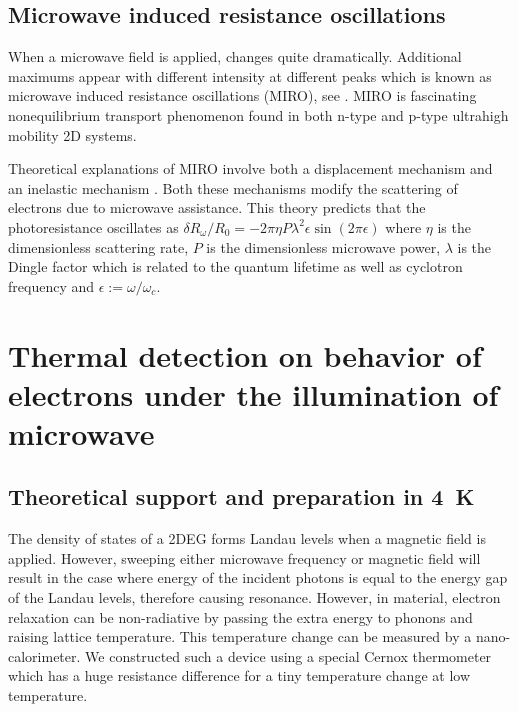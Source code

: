 \documentclass[12pt]{ruthesis}
\begin{document}
\section{Microwave induced resistance oscillations}\label{MIRO}

When a microwave field is applied,  changes quite dramatically.
Additional maximums appear with different intensity at different peaks which is known as microwave induced resistance oscillations (MIRO), see .
MIRO is fascinating nonequilibrium transport phenomenon found in both n-type and p-type ultrahigh mobility 2D systems. 


 
Theoretical explanations of MIRO involve both a displacement mechanism and an inelastic mechanism \cite{PhysRevB.89.125401}.
Both these mechanisms modify the scattering of electrons due to microwave assistance. This theory predicts that the photoresistance oscillates as
$\delta R_{\omega}/R_{0} =-2\pi\eta P\lambda^{2}\epsilon \sin(2\pi\epsilon)$
where $\eta$ is the dimensionless scattering rate, $P$ is the dimensionless microwave power, $\lambda$ is the Dingle factor which is related to the quantum lifetime as well as cyclotron frequency and $\epsilon :=\omega/\omega_{c}$. 



\chapter{Thermal detection on behavior of electrons under the illumination of microwave}\label{Thermal}





\section{Theoretical support and preparation in \SI{4}{K}}\label{Theoretical}

The density of states of a 2DEG forms Landau levels when a magnetic field is applied.
However, sweeping either microwave frequency or magnetic field will result in the case where energy of the incident photons is equal to the energy gap of the Landau levels, therefore causing resonance.
However, in  material, electron relaxation can be non-radiative by passing the extra energy to phonons and raising lattice temperature.
This temperature change can be measured by a nano-calorimeter.
We constructed such a device using a special Cernox thermometer which has a huge resistance difference for a tiny temperature change at low temperature.
\end{document}
